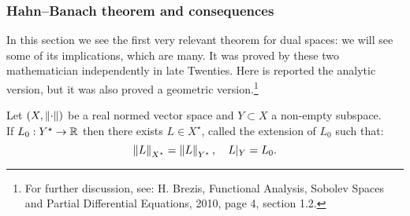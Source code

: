 \subsubsection{Hahn--Banach theorem and consequences}
In this section we see the first very relevant theorem for dual spaces: we will see some of its implications, which are many. It was proved by these two mathematician independently in late Twenties. Here is reported the analytic version, but it was also proved a geometric version.\footnote{For further discussion, see: H. Brezis, Functional Analysis, Sobolev Spaces and Partial Differential Equations, 2010, page 4, section 1.2.}
\begin{theo}
	Let $(X, \left\lVert\cdot\right\rVert)$ be a real normed vector space and $Y \subset X$ a non-empty subspace. \\
	If $L_0 : Y^\star \to \mathbb R$ then there exists $L \in X^\star$, called the extension of $L_0$ such that:
	$$
		\left\lVert L\right\rVert_{X^\star} 
		= \left\lVert L\right\rVert_{Y^\star}, 
		\quad L|_Y 
		= L_0
		.
	$$
\end{theo}

